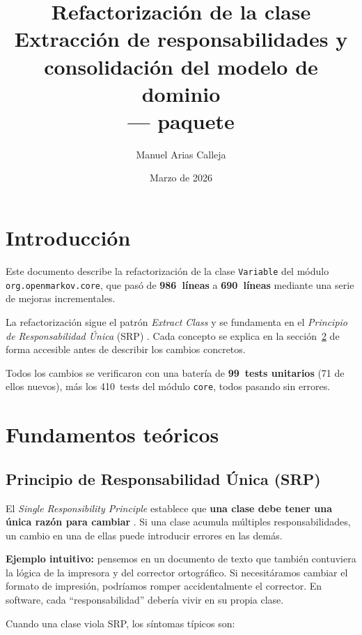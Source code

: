 \documentclass[11pt,a4paper]{article}
\title{Refactorizaci\'on de la clase \code{Variable}\\
       \large Extracci\'on de responsabilidades y consolidaci\'on
              del modelo de dominio\\[4pt]
       \normalsize \code{org.openmarkov.core} --- paquete \code{model.network}}
\author{Manuel Arias Calleja}
\date{Marzo de 2026}
\newcommand{\code}[1]{\texttt{#1}}
\newcommand{\bad}[1]{\textcolor{codered}{\textbf{#1}}}
\newcommand{\good}[1]{\textcolor{codegreen}{\textbf{#1}}}
\begin{document}
\maketitle
\tableofcontents
\newpage

\section{Introducci\'on}

Este documento describe la refactorizaci\'on de la clase \code{Variable}
del m\'odulo \code{org.openmarkov.core}, que pas\'o de \bad{986~l\'ineas}
a \good{690~l\'ineas} mediante una serie de mejoras incrementales.

La refactorizaci\'on sigue el patr\'on \emph{Extract Class}
\cite{fowler2019} y se fundamenta en el \emph{Principio de
Responsabilidad \'Unica} (SRP) \cite{martin2003}.  Cada concepto se
explica en la secci\'on~\ref{sec:teoria} de forma accesible antes de
describir los cambios concretos.

Todos los cambios se verificaron con una bater\'ia de \textbf{99~tests
unitarios} (71 de ellos nuevos), m\'as los 410~tests del m\'odulo
\code{core}, todos pasando sin errores.

\section{Fundamentos te\'oricos}
\label{sec:teoria}

\subsection{Principio de Responsabilidad \'Unica (SRP)}

El \emph{Single Responsibility Principle} establece que \textbf{una clase
debe tener una \'unica raz\'on para cambiar} \cite{martin2003}.  Si una
clase acumula m\'ultiples responsabilidades, un cambio en una de ellas
puede introducir errores en las dem\'as.

\textbf{Ejemplo intuitivo:} pensemos en un documento de texto que
tambi\'en contuviera la l\'ogica de la impresora y del corrector
ortogr\'afico.  Si necesit\'aramos cambiar el formato de impresi\'on,
podr\'iamos romper accidentalmente el corrector.  En software, cada
``responsabilidad'' deber\'ia vivir en su propia clase.

Cuando una clase viola SRP, los s\'intomas t\'ipicos son:
\end{document}
